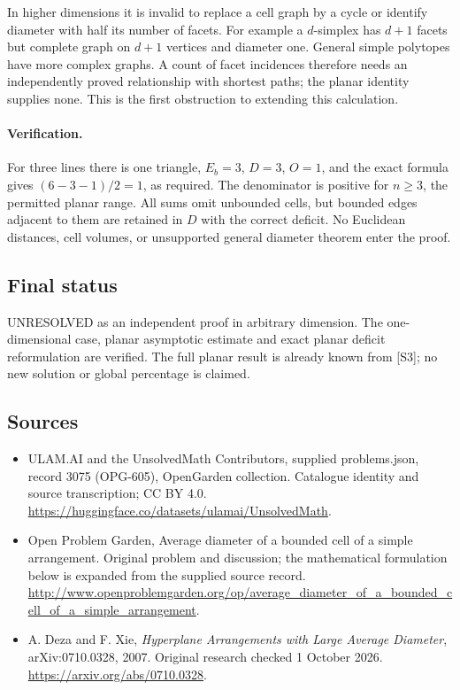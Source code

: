 \documentclass[11pt,a4paper]{article}
\begin{document}
In higher dimensions it is invalid to replace a cell graph by a
cycle or identify diameter with half its number of facets. For
example a $d$-simplex has $d+1$ facets but complete graph on $d+1$
vertices and diameter one. General simple polytopes have more complex
graphs. A count of facet incidences therefore needs an independently
proved relationship with shortest paths; the planar identity supplies
none. This is the first obstruction to extending this calculation.

\paragraph{Verification.}
For three lines there is one triangle, $E_b=3$, $D=3$, $O=1$,
and the exact formula gives $(6-3-1)/2=1$, as required.
The denominator is positive for $n\ge3$, the permitted planar range.
All sums omit unbounded cells, but bounded edges adjacent to them
are retained in $D$ with the correct deficit. No Euclidean distances,
cell volumes, or unsupported general diameter theorem enter the proof.

\subsection{Final status}
UNRESOLVED as an independent proof in arbitrary dimension. The
one-dimensional case, planar asymptotic estimate and exact planar
deficit reformulation are verified. The full planar result is already
known from [S3]; no new solution or global percentage is claimed.

\subsection{Sources}
\begin{itemize}
\item[S1] ULAM.AI and the UnsolvedMath Contributors, supplied problems.json, record 3075 (OPG-605), OpenGarden collection. Catalogue identity and source transcription; CC BY 4.0.
\url{https://huggingface.co/datasets/ulamai/UnsolvedMath}.
\item[S2] Open Problem Garden, Average diameter of a bounded cell of a simple arrangement. Original problem and discussion; the mathematical formulation below is expanded from the supplied source record.
\url{http://www.openproblemgarden.org/op/average_diameter_of_a_bounded_cell_of_a_simple_arrangement}.
\item[S3] A. Deza and F. Xie, \emph{Hyperplane Arrangements with Large Average Diameter}, arXiv:0710.0328, 2007. Original research checked 1 October 2026.
\url{https://arxiv.org/abs/0710.0328}.
\end{itemize}
\end{document}
